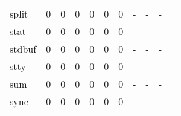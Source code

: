 \begin{longtable}{lp{1.2cm}p{1.2cm}p{1.2cm}p{1.2cm}p{1.2cm}p{1.2cm}p{1.2cm}p{1.2cm}p{1.2cm}p{1.2cm}}
split     &                                     0 &                                                  0 &                                                  0 &                                                  0 &                                                  0 &                                                  0 &                                                  - &                                                  - &                                                  - \\
stat      &                                     0 &                                                  0 &                                                  0 &                                                  0 &                                                  0 &                                                  0 &                                                  - &                                                  - &                                                  - \\
stdbuf    &                                     0 &                                                  0 &                                                  0 &                                                  0 &                                                  0 &                                                  0 &                                                  - &                                                  - &                                                  - \\
stty      &                                     0 &                                                  0 &                                                  0 &                                                  0 &                                                  0 &                                                  0 &                                                  - &                                                  - &                                                  - \\
sum       &                                     0 &                                                  0 &                                                  0 &                                                  0 &                                                  0 &                                                  0 &                                                  - &                                                  - &                                                  - \\
sync      &                                     0 &                                                  0 &                                                  0 &                                                  0 &                                                  0 &                                                  0 &                                                  - &                                                  - &                                                  - \\

\end{longtable}
